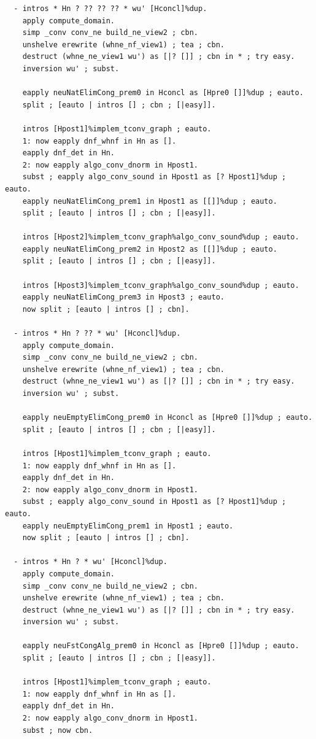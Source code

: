 \documentclass[10pt,a4paper]{amsart}
\begin{document}
\begin{lstlisting}
  - intros * Hn ? ?? ?? ?? * wu' [Hconcl]%dup.
    apply compute_domain.
    simp _conv conv_ne build_ne_view2 ; cbn.
    unshelve erewrite (whne_nf_view1) ; tea ; cbn.
    destruct (whne_ne_view1 wu') as [|? []] ; cbn in * ; try easy.
    inversion wu' ; subst.

    eapply neuNatElimCong_prem0 in Hconcl as [Hpre0 []]%dup ; eauto.
    split ; [eauto | intros [] ; cbn ; [|easy]].

    intros [Hpost1]%implem_tconv_graph ; eauto.
    1: now eapply dnf_whnf in Hn as [].
    eapply dnf_det in Hn.
    2: now eapply algo_conv_dnorm in Hpost1.
    subst ; eapply algo_conv_sound in Hpost1 as [? Hpost1]%dup ; eauto.
    eapply neuNatElimCong_prem1 in Hpost1 as [[]]%dup ; eauto.
    split ; [eauto | intros [] ; cbn ; [|easy]].

    intros [Hpost2]%implem_tconv_graph%algo_conv_sound%dup ; eauto.
    eapply neuNatElimCong_prem2 in Hpost2 as [[]]%dup ; eauto.
    split ; [eauto | intros [] ; cbn ; [|easy]].

    intros [Hpost3]%implem_tconv_graph%algo_conv_sound%dup ; eauto.
    eapply neuNatElimCong_prem3 in Hpost3 ; eauto.
    now split ; [eauto | intros [] ; cbn].

  - intros * Hn ? ?? * wu' [Hconcl]%dup.
    apply compute_domain.
    simp _conv conv_ne build_ne_view2 ; cbn.
    unshelve erewrite (whne_nf_view1) ; tea ; cbn.
    destruct (whne_ne_view1 wu') as [|? []] ; cbn in * ; try easy.
    inversion wu' ; subst.

    eapply neuEmptyElimCong_prem0 in Hconcl as [Hpre0 []]%dup ; eauto.
    split ; [eauto | intros [] ; cbn ; [|easy]].

    intros [Hpost1]%implem_tconv_graph ; eauto.
    1: now eapply dnf_whnf in Hn as [].
    eapply dnf_det in Hn.
    2: now eapply algo_conv_dnorm in Hpost1.
    subst ; eapply algo_conv_sound in Hpost1 as [? Hpost1]%dup ; eauto.
    eapply neuEmptyElimCong_prem1 in Hpost1 ; eauto.
    now split ; [eauto | intros [] ; cbn].

  - intros * Hn ? * wu' [Hconcl]%dup.
    apply compute_domain.
    simp _conv conv_ne build_ne_view2 ; cbn.
    unshelve erewrite (whne_nf_view1) ; tea ; cbn.
    destruct (whne_ne_view1 wu') as [|? []] ; cbn in * ; try easy.
    inversion wu' ; subst.

    eapply neuFstCongAlg_prem0 in Hconcl as [Hpre0 []]%dup ; eauto.
    split ; [eauto | intros [] ; cbn ; [|easy]].

    intros [Hpost1]%implem_tconv_graph ; eauto.
    1: now eapply dnf_whnf in Hn as [].
    eapply dnf_det in Hn.
    2: now eapply algo_conv_dnorm in Hpost1.
    subst ; now cbn.
    

\end{lstlisting}
\end{document}
